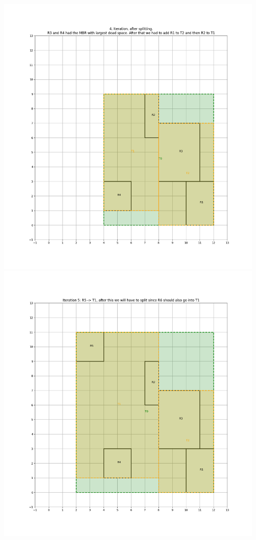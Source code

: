 \begin{center}
        \includegraphics[scale=0.5]{./A1 figs/iter4.png}
        \includegraphics[scale=0.5]{./A1 figs/iter5.png}

\end{center}
